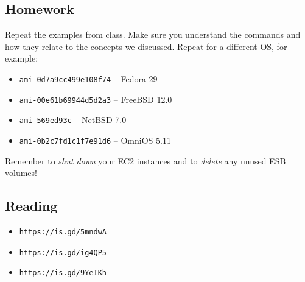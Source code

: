 \documentclass[xga]{xdvislides}
\begin{document}
%
%
\subsection{Homework}
Repeat the examples from class.  Make sure you understand the commands and
how they relate to the concepts we discussed.  Repeat for a different OS,
for example: \\

\begin{itemize}
	\item {\tt ami-0d7a9cc499e108f74} -- Fedora 29
	\item {\tt ami-00e61b69944d5d2a3} -- FreeBSD 12.0
	\item {\tt ami-569ed93c} -- NetBSD 7.0
	\item {\tt ami-0b2c7fd1c1f7e91d6} -- OmniOS 5.11
\end{itemize}

\vspace{.5in}
Remember to {\em shut down} your EC2 instances and to {\em delete} any unused ESB
volumes!



\subsection{Reading}
\begin{itemize}
	\item \verb+https://is.gd/5mndwA+
	\item \verb+https://is.gd/ig4QP5+
	\item \verb+https://is.gd/9YeIKh+
\end{itemize}
\end{document}
